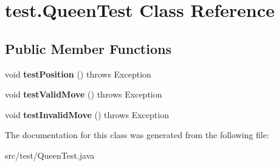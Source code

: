 \hypertarget{classtest_1_1_queen_test}{}\section{test.\+Queen\+Test Class Reference}
\label{classtest_1_1_queen_test}
\subsection*{Public Member Functions}
\begin{DoxyCompactItemize}
\item 
\mbox{\label{classtest_1_1_queen_test_aabbf0e42036c2ff1b09f22c3a5b7ffe8}} 
void {\bfseries test\+Position} ()  throws Exception 
\item 
\mbox{\label{classtest_1_1_queen_test_aa078634711194ba68c6fb369a3977a26}} 
void {\bfseries test\+Valid\+Move} ()  throws Exception 
\item 
\mbox{\label{classtest_1_1_queen_test_ab2bf06f0a33bf23eac9b28834ac0563c}} 
void {\bfseries test\+Invalid\+Move} ()  throws Exception 
\end{DoxyCompactItemize}


The documentation for this class was generated from the following file\+:\begin{DoxyCompactItemize}
\item 
src/test/Queen\+Test.\+java\end{DoxyCompactItemize}
